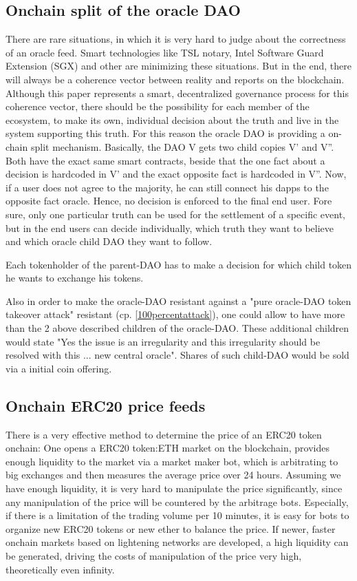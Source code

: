 \documentclass[a4paper]{article}
\begin{document}
\subsection{Onchain split of the oracle DAO} \label{DAOsplit}
There are rare situations, in which it is very hard to judge about the correctness of an oracle feed. Smart technologies like TSL notary, Intel Software Guard Extension (SGX) and other are minimizing these situations. But in the end, there will always be a coherence vector between reality and reports on the blockchain. Although this paper represents a smart, decentralized governance process for this coherence vector, there should be the possibility for each member of the ecosystem, to make its own, individual decision about the truth and live in the system supporting this truth. 
For this reason the oracle DAO is providing a on-chain split mechanism. Basically, the DAO V gets two child copies V' and V''. Both have the exact same smart contracts, beside that the one fact about a decision is hardcoded in V' and the exact opposite fact is hardcoded in V''. Now, if a user does not agree to the majority, he can still connect his dapps to the opposite fact oracle. Hence, no decision is enforced to the final end user. Fore sure, only one particular truth can be used for the settlement of a specific event, but in the end users can decide individually, which truth they want to believe and which oracle child DAO they want to follow.

Each tokenholder of the parent-DAO has to make a decision for which child token he wants to exchange his tokens. 


Also in order to make the oracle-DAO resistant against a "pure oracle-DAO token takeover attack" resistant (cp. \ref{100percentattack}), one could allow to have more than the 2 above described children of the oracle-DAO. These additional children would state "Yes the issue is an irregularity and this irregularity should be resolved with this ... new central oracle". Shares of such child-DAO would be sold via a initial coin offering.
\subsection{Onchain ERC20 price feeds} \label{onchainmarket}
There is a very effective method to determine the price of an ERC20 token onchain: One opens a ERC20 token:ETH market on the blockchain, provides enough liquidity to the market via a market maker bot, which is arbitrating to big exchanges and then measures the average price over 24 hours. Assuming we have enough liquidity, it is very hard to manipulate the price significantly, since any manipulation of the price will be countered by the arbitrage bots. Especially, if there is a limitation of the trading volume per 10 minutes, it is easy for bots to organize new ERC20 tokens or new ether to balance the price.
If newer, faster onchain markets based on lightening networks are developed, a high liquidity can be generated, driving the costs of manipulation of the price very high, theoretically even infinity. 
\end{document}
